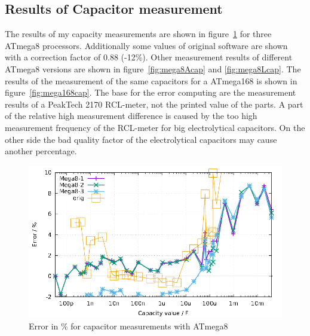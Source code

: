 \subsection{Results of Capacitor measurement}
The results of my capacity measurements are shown in figure~\ref{fig:mega8cap} for three ATmega8 processors.
Additionally some values of original software are shown with a correction factor of 0.88 (-12\%).
Other measurement results of different ATmega8 versions are shown in figure~\ref{fig:mega8Acap} and \ref{fig:mega8Lcap}.
The results of the measurement of the same capacitors for a ATmega168 is shown in figure~\ref{fig:mega168cap}.
The base for the error computing are the measurement results of a PeakTech 2170 RCL-meter, not the printed value
of the parts.
A part of the relative high measurement difference is caused by the too high measurement frequency of the RCL-meter for big
electrolytical capacitors. On the other side the bad quality factor of the electrolytical capacitors may cause
another percentage.

\begin{figure}[H]
\centering
\includegraphics[width=18cm]{../GNU/Mega8cap.pdf}
\caption{Error in \% for capacitor measurements with ATmega8 }
\label{fig:mega8cap}
\end{figure}

